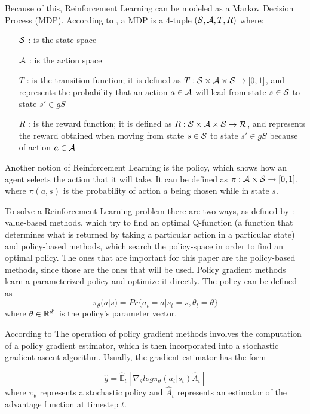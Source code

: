 Because of this, Reinforcement Learning can be modeled as a Markov Decision Process (MDP). According to \cite{Bellman_MDP}, a MDP is a 4-tuple $({\mathcal{S}}, {\mathcal{A}}, T, R)$ where:
\begin{itemize}
    \item [${\mathcal{S}}$]: is the state space
    \item [${\mathcal{A}}$]: is the action space
    \item [$T$]: is the transition function; it is defined as $T: {\mathcal{S}} \times {\mathcal{A}} \times {\mathcal{S}} \rightarrow [0, 1]$, and represents the probability that an action $a \in {\mathcal{A}}$ will lead from state $s \in {\mathcal{S}}$ to state $s' \in gS$
    \item [$R$]: is the reward function; it is defined as $R: {\mathcal{S}} \times {\mathcal{A}} \times {\mathcal{S}} \rightarrow {\mathcal{R}}$, and represents the reward obtained when moving from state $s \in {\mathcal{S}}$ to state $s' \in gS$ because of action $a \in {\mathcal{A}}$
\end{itemize}

Another notion of Reinforcement Learning is the policy, which shows how an agent selects the action that it will take. It can be defined as $\pi: {\mathcal{A}} \times {\mathcal{S}} \rightarrow [0, 1]$, where $\pi(a, s)$ is the probability of action $a$ being chosen while in state $s$.

To solve a Reinforcement Learning problem there are two ways, as defined by \cite{yang2021overviewmultiagentrl}: value-based methods, which try to find an optimal Q-function (a function that determines what is returned by taking a particular action in a particular state) and policy-based methods, which search the policy-space in order to find an optimal policy. The ones that are important for this paper are the policy-based methods, since those are the ones that will be used. Policy gradient methods learn a parameterized policy and optimize it directly. The policy can be defined as 
\begin{equation} \label{policy_eq:1}
    \pi_{\theta} (a | s) = Pr\{a_t = a | s_t = s, \theta_{t} = \theta\}
\end{equation}
where $\theta \in {\mathbb{R}}^{d'}$ is the policy's parameter vector.




According to \cite{schulman2017ppo} The operation of policy gradient methods involves the computation of a policy gradient estimator, which is then incorporated into a stochastic gradient ascent algorithm. Usually, the gradient estimator has the form 

\begin{equation}
    \hat{g} = \hat{\mathbb{E}}_{t} [\nabla_{\theta} log \pi_{\theta}(a_t | s_t) \hat{A}_{t}]    
\end{equation}
where $\pi_{\theta}$ represents a stochastic policy and $\hat{A}_{t}$ represents an estimator of the advantage function at timestep $t$.

